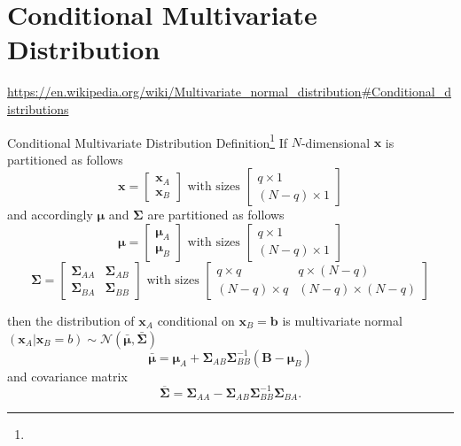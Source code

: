 \documentclass{beamer}
\begin{document}
	\section{Conditional Multivariate Distribution}
	
	
	\urldef\urlwik\url{https://en.wikipedia.org/wiki/Multivariate\_normal\_distribution#Conditional\_distributions}
	
	\label{sec:condMul}
	\begin{frame}{Conditional Multivariate Distribution Definition\footnote{\urlwik}}
		If $N$-dimensional $\mathbf{x}$ is partitioned as follows
		$$\mathbf{x}
		=
		\begin{bmatrix}
		\mathbf{x}_A \\
		\mathbf{x}_B
		\end{bmatrix}
		\text{ with sizes }\begin{bmatrix} q \times 1 \\ (N-q) \times 1 \end{bmatrix}$$
		and accordingly $\mathbf{\mu}$ and $\mathbf{\Sigma}$ are partitioned as follows
		$$\boldsymbol\mu
		=
		\begin{bmatrix}
		\boldsymbol\mu_A \\
		\boldsymbol\mu_B
		\end{bmatrix}
		\text{ with sizes }\begin{bmatrix} q \times 1 \\ (N-q) \times 1 \end{bmatrix}$$
		$$\boldsymbol\Sigma
		=
		\begin{bmatrix}
		\boldsymbol\Sigma_{AA} & \boldsymbol\Sigma_{AB} \\
		\boldsymbol\Sigma_{BA} & \boldsymbol\Sigma_{BB}
		\end{bmatrix}
		\text{ with sizes }\begin{bmatrix} q \times q & q \times (N-q) \\ (N-q) \times q & (N-q) \times (N-q) \end{bmatrix}$$	
	\end{frame}
	
	\begin{frame}
		then the distribution of $\mathbf{x}_A$ conditional on $\mathbf{x}_B = \mathbf{b}$ is multivariate normal $(\mathbf{x}_A|\mathbf{x}_B=b)\sim \mathcal{N}(\bar{\mathbf{\mu}}, \bar{\mathbf{\Sigma}})$
		$$\bar{\boldsymbol\mu}
		=
		\boldsymbol\mu_A + \boldsymbol\Sigma_{AB} \boldsymbol\Sigma_{BB}^{-1}
		\left(
		\mathbf{B} - \boldsymbol\mu_B
		\right)$$
		and covariance matrix
		$$\overline{\boldsymbol\Sigma}
		=
		\boldsymbol\Sigma_{AA} - \boldsymbol\Sigma_{AB} \boldsymbol\Sigma_{BB}^{-1} \boldsymbol\Sigma_{BA}.$$
		
	\end{frame}
	
\end{document}
